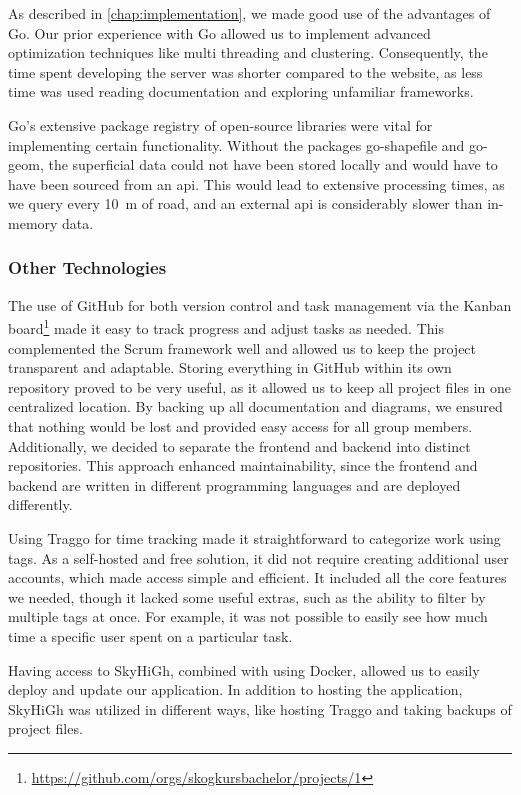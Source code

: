As described in \autoref{chap:implementation}, we made good use of the advantages of Go. Our prior experience with Go allowed us to implement advanced optimization techniques like multi threading and clustering. Consequently, the time spent developing the server was shorter compared to the website, as less time was used reading documentation and exploring unfamiliar frameworks.

Go's extensive package registry of open-source libraries were vital for implementing certain functionality. Without the packages go-shapefile and go-geom, the superficial data could not have been stored locally and would have to have been sourced from an \acrshort{api}. This would lead to extensive processing times, as we query every \qty{10}{\meter} of road, and an external \acrshort{api} is considerably slower than in-memory data.

\subsubsection{Other Technologies}

The use of GitHub for both version control and task management via the Kanban board\footnote{\url{https://github.com/orgs/skogkursbachelor/projects/1}} made it easy to track progress and adjust tasks as needed. This complemented the Scrum framework well and allowed us to keep the project transparent and adaptable. Storing everything in GitHub within its own repository proved to be very useful, as it allowed us to keep all project files in one centralized location. By backing up all documentation and diagrams, we ensured that nothing would be lost and provided easy access for all group members. Additionally, we decided to separate the frontend and backend into distinct repositories. This approach enhanced maintainability, since the frontend and backend are written in different programming languages and are deployed differently.

Using Traggo for time tracking made it straightforward to categorize work using tags. As a self-hosted and free solution, it did not require creating additional user accounts, which made access simple and efficient. It included all the core features we needed, though it lacked some useful extras, such as the ability to filter by multiple tags at once. For example, it was not possible to easily see how much time a specific user spent on a particular task.

Having access to SkyHiGh, combined with using Docker, allowed us to easily deploy and update our application. In addition to hosting the application, SkyHiGh was utilized in different ways, like hosting Traggo and taking backups of project files. 

